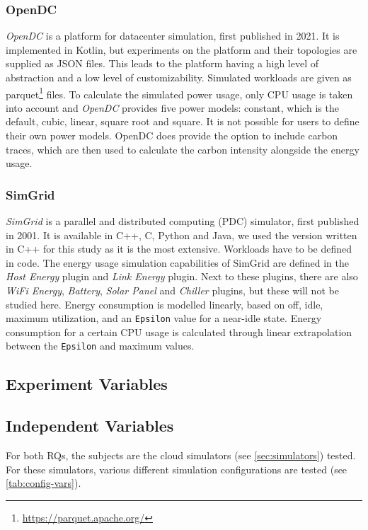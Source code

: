 
\subsubsection{OpenDC}
\textit{OpenDC} \cite{mastenbroek_opendc_2021} is a platform for datacenter simulation, first published in 2021. It is implemented in Kotlin, but experiments on the platform and their topologies are supplied as JSON files. This leads to the platform having a high level of abstraction and a low level of customizability. Simulated workloads are given as parquet\footnote{\url{https://parquet.apache.org/}} files. To calculate the simulated power usage, only CPU usage is taken into account and \textit{OpenDC} provides five power models: constant, which is the default, cubic, linear, square root and square. It is not possible for users to define their own power models. OpenDC does provide the option to include carbon traces, which are then used to calculate the carbon intensity alongside the energy usage.

\subsubsection{SimGrid}
\textit{SimGrid} \cite{casanova_simgrid_2025} is a parallel and distributed computing (PDC) simulator, first published in 2001\cite{casanova_simgrid_2001}. It is available in C++, C, Python and Java, we used the version written in C++ for this study as it is the most extensive. Workloads have to be defined in code. The energy usage simulation capabilities of SimGrid are defined in the \textit{Host Energy} plugin \cite{simgridPower_heinrich_predicting_2017} and \textit{Link Energy} plugin. Next to these plugins, there are also \textit{WiFi Energy}, \textit{Battery}, \textit{Solar Panel} and \textit{Chiller} plugins, but these will not be studied here. Energy consumption is modelled linearly, based on off, idle, maximum utilization, and an \verb|Epsilon| value for a near-idle state. Energy consumption for a certain CPU usage is calculated through linear extrapolation between the \verb|Epsilon| and maximum values.

\subsection{Experiment Variables}
\subsection{Independent Variables} \label{sec:independentVars}
For both RQs, the subjects are the cloud simulators (see \autoref{sec:simulators}) tested. For these simulators, various different simulation configurations are tested (see \autoref{tab:config-vars}).

